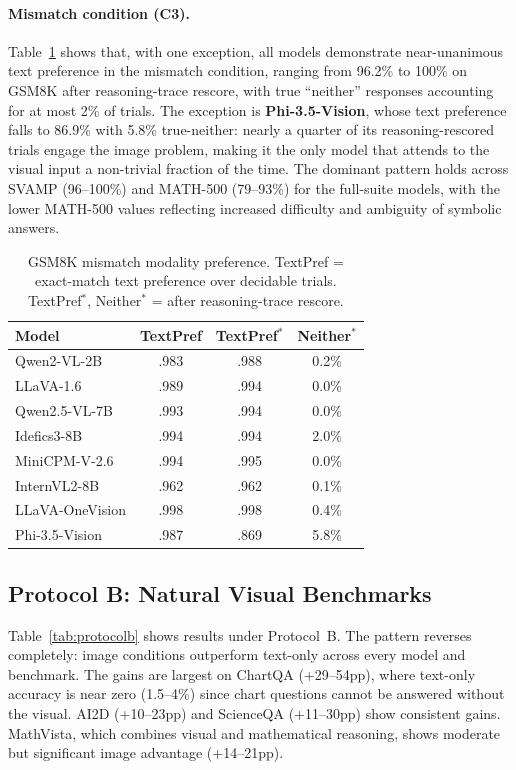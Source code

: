 \documentclass[11pt]{article}
\begin{document}
\paragraph{Mismatch condition (C3).}
Table~\ref{tab:mismatch} shows that, with one exception, all models demonstrate near-unanimous text preference in the mismatch condition, ranging from 96.2\% to 100\% on GSM8K after reasoning-trace rescore, with true ``neither'' responses accounting for at most 2\% of trials. The exception is \textbf{Phi-3.5-Vision}, whose text preference falls to 86.9\% with 5.8\% true-neither: nearly a quarter of its reasoning-rescored trials engage the image problem, making it the only model that attends to the visual input a non-trivial fraction of the time. The dominant pattern holds across SVAMP (96--100\%) and MATH-500 (79--93\%) for the full-suite models, with the lower MATH-500 values reflecting increased difficulty and ambiguity of symbolic answers.

\begin{table}[h]
\centering
\small
\begin{tabular}{lccc}
\toprule
\textbf{Model} & \textbf{TextPref} & \textbf{TextPref$^*$} & \textbf{Neither$^*$} \\
\midrule
Qwen2-VL-2B        & .983 & .988 & 0.2\% \\
LLaVA-1.6          & .989 & .994 & 0.0\% \\
Qwen2.5-VL-7B      & .993 & .994 & 0.0\% \\
Idefics3-8B        & .994 & .994 & 2.0\% \\
MiniCPM-V-2.6      & .994 & .995 & 0.0\% \\
InternVL2-8B       & .962 & .962 & 0.1\% \\
LLaVA-OneVision    & .998 & .998 & 0.4\% \\
Phi-3.5-Vision     & .987 & .869 & 5.8\% \\
\bottomrule
\end{tabular}
\caption{GSM8K mismatch modality preference. TextPref = exact-match text preference over decidable trials. TextPref$^*$, Neither$^*$ = after reasoning-trace rescore.}
\label{tab:mismatch}
\end{table}

\subsection{Protocol B: Natural Visual Benchmarks}

Table~\ref{tab:protocolb} shows results under Protocol~B. The pattern reverses completely: image conditions outperform text-only across every model and benchmark. The gains are largest on ChartQA (+29--54pp), where text-only accuracy is near zero (1.5--4\%) since chart questions cannot be answered without the visual. AI2D (+10--23pp) and ScienceQA (+11--30pp) show consistent gains. MathVista, which combines visual and mathematical reasoning, shows moderate but significant image advantage (+14--21pp).
\end{document}
